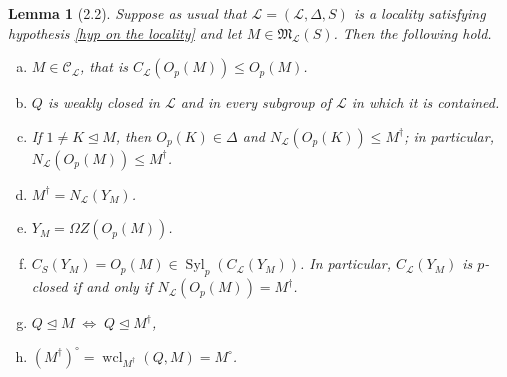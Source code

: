 \documentclass{amsart}
\numberwithin{equation}{section}
\newtheorem{lemma}[equation]{Lemma}
\theoremstyle{definition}
\theoremstyle{subresult}
\theoremstyle{caseresult}
\newcommand{\gM}{\mathfrak{M}}
\renewcommand{\L}{\mathcal{L}}
\newcommand{\C}{\mathcal{C}}
\newcommand{\Syl}{\operatorname{Syl}}
\newcommand{\wcl}{\operatorname{wcl}}
\newcommand{\norm}{\trianglelefteq}
\newcommand{\<}{\langle}
\renewcommand{\>}{\rangle}
\begin{document}
\begin{lemma}[2.2]\label{lemma2.2}
	Suppose as usual that $\L=(\L,\Delta,S)$ is a locality satisfying hypothesis \ref{hyp on the locality} and let $M \in \gM_\L(S)$. Then the following hold.
	\begin{enumerate}[(a)]
		\item $M \in \C_\L$, that is $C_\L(O_p(M)) \le O_p(M)$.
		\item $Q$ is weakly closed in $\L$ and in every subgroup of $\L$ in which it is contained.
		\item If $1 \ne K \norm M$, then $O_p(K) \in \Delta$ and $N_\L(O_p(K))\le M^\dagger$; in particular, $N_\L(O_p(M)) \le M^\dagger$.
		\item $M^\dagger = N_\L(Y_M)$.
		\item $Y_M = \Omega Z(O_p(M))$.
		\item $C_S(Y_M) = O_p(M) \in \Syl_p(C_\L(Y_M))$. In particular, $C_\L(Y_M)$ is $p$-closed if and only if $N_\L(O_p(M))=M^\dagger$.
		\item $Q \norm M \; \iff \; Q \norm M^\dagger$,
		\item $(M^\dagger)^\circ =\wcl_{M^\dagger}(Q,M) = M^\circ$.
	\end{enumerate}
\end{lemma}
\end{document}
